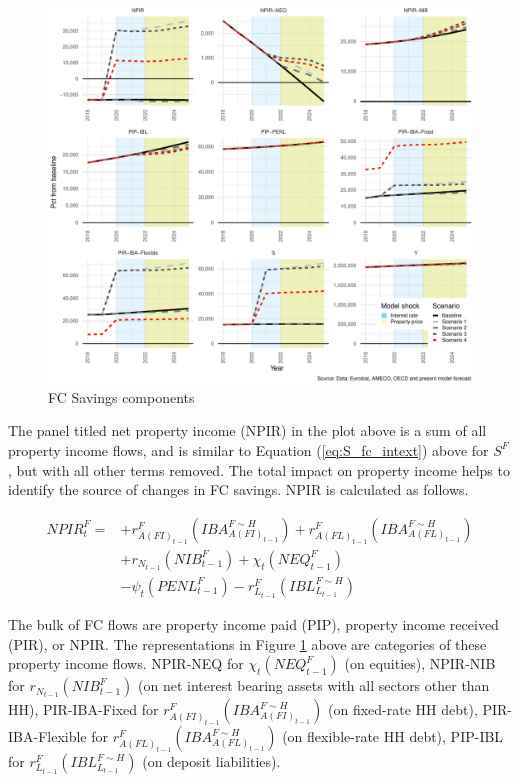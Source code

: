 \documentclass[
]{book}
\begin{document}
\begin{figure}
\centering
\includegraphics{figures/fl-fi-sfc-plot-fc-indicators-saving-1.pdf}
\caption{\label{fig:fl-fi-sfc-plot-fc-indicators-saving}FC Savings components}
\end{figure}

The panel titled net property income (NPIR) in the plot above is a sum of all property income flows, and is similar to Equation (\ref{eq:S_fc_intext}) above for \(S^F\), but with all other terms removed. The total impact on property income helps to identify the source of changes in FC savings. NPIR is calculated as follows.

\begin{equation}
\begin{split}
    NPIR^F_t = & + r^F_{A(FI)_{t-1}}(IBA^{F\sim H}_{A(FI)_{t-1}}) + r^F_{A(FL)_{t-1}}(IBA^{F\sim H}_{A(FL)_{t-1}}) \\
               & + r_{N_{t-1}}(NIB^F_{t-1}) + \chi _t(NEQ^F_{t-1})  \\
               & -\psi _t(PENL^F_{t-1}) - r^F_{L_{t-1}}(IBL^{F\sim H}_{L_{t-1}})
\end{split}
\label{eq:NPIR_fc_intext}
\end{equation}

The bulk of FC flows are property income paid (PIP), property income received (PIR), or NPIR. The representations in Figure \ref{fig:fl-fi-sfc-plot-fc-indicators-saving} above are categories of these property income flows. NPIR-NEQ for \(\chi _t(NEQ^F_{t-1})\) (on equities), NPIR-NIB for \(r_{N_{t-1}}(NIB^F_{t-1})\) (on net interest bearing assets with all sectors other than HH), PIR-IBA-Fixed for \(r^F_{A(FI)_{t-1}}(IBA^{F\sim H}_{A(FI)_{t-1}})\) (on fixed-rate HH debt), PIR-IBA-Flexible for \(r^F_{A(FL)_{t-1}}(IBA^{F\sim H}_{A(FL)_{t-1}})\) (on flexible-rate HH debt), PIP-IBL for \(r^F_{L_{t-1}}(IBL^{F\sim H}_{L_{t-1}})\) (on deposit liabilities).
\end{document}
